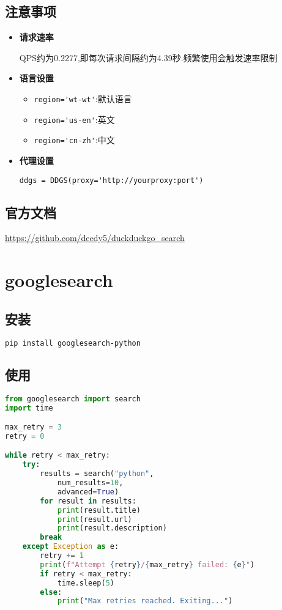 \documentclass[a4paper,12pt]{article}
\begin{document}
\subsection{注意事项}
\begin{itemize}
    \item \textbf{请求速率}
    
    QPS约为0.2277,即每次请求间隔约为4.39秒.频繁使用会触发速率限制
    \item \textbf{语言设置}
    \begin{itemize}
        \item \verb|region='wt-wt'|:默认语言
        \item \verb|region='us-en'|:英文
        \item \verb|region='cn-zh'|:中文
    \end{itemize}
    \item \textbf{代理设置}
    
    \verb|ddgs = DDGS(proxy='http://yourproxy:port')|
\end{itemize}

\subsection{官方文档}
\url{https://github.com/deedy5/duckduckgo_search}

\section{googlesearch}
\subsection{安装}
\begin{lstlisting}[language=bash]
pip install googlesearch-python
\end{lstlisting}

\subsection{使用}
\begin{lstlisting}[language=python]
from googlesearch import search
import time

max_retry = 3
retry = 0

while retry < max_retry:
    try:
        results = search("python", 
            num_results=10, 
            advanced=True)
        for result in results:
            print(result.title)
            print(result.url)
            print(result.description)
        break
    except Exception as e:
        retry += 1
        print(f"Attempt {retry}/{max_retry} failed: {e}")
        if retry < max_retry:
            time.sleep(5)
        else:
            print("Max retries reached. Exiting...")
\end{lstlisting}
\end{document}

